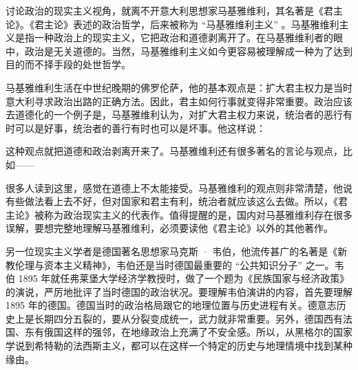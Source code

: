 讨论政治的现实主义视角，就离不开意大利思想家马基雅维利，其名著是《君主论》。《君主论》表述的政治哲学，后来被称为 “马基雅维利主义” 。马基雅维利主义是指一种政治上的现实主义，它把政治和道德剥离开了。在马基雅维利者的眼中，政治是无关道德的。当然，马基雅维利主义如今更容易被理解成一种为了达到目的而不择手段的处世哲学。

马基雅维利生活在中世纪晚期的佛罗伦萨，他的基本观点是：扩大君主权力是当时意大利寻求政治出路的正确方法。因此，君主如何行事就变得非常重要。政治应该去道德化的一个例子是，马基雅维利认为，对扩大君主权力来说，统治者的恶行有时可以是好事，统治者的善行有时也可以是坏事。他这样说：


这种观点就把道德和政治剥离开来了。马基雅维利还有很多著名的言论与观点，比如——


很多人读到这里，感觉在道德上不太能接受。马基雅维利的观点则非常清楚，他说有些做法看上去不好，但对国家和君主有利，统治者就应该这么去做。所以，《君主论》被称为政治现实主义的代表作。值得提醒的是，国内对马基雅维利存在很多误解，要想完整地理解马基雅维利，必须要读他《君主论》以外的其他著作。

另一位现实主义学者是德国著名思想家马克斯 · 韦伯，他流传甚广的名著是《新教伦理与资本主义精神》，韦伯还是当时德国最重要的 “公共知识分子” 之一。韦伯 1895 年就任弗莱堡大学经济学教授时，做了一个题为《民族国家与经济政策》的演说，严厉地批评了当时德国的政治状况。要理解韦伯演讲的内容，首先要理解 1895 年的德国。德国当时的政治格局跟它的地理位置与历史进程有关。德意志历史上是长期四分五裂的，要从分裂变成统一，武力就非常重要。另外，德国西有法国、东有俄国这样的强邻，在地缘政治上充满了不安全感。所以，从黑格尔的国家学说到希特勒的法西斯主义，都可以在这样一个特定的历史与地理情境中找到某种缘由。

